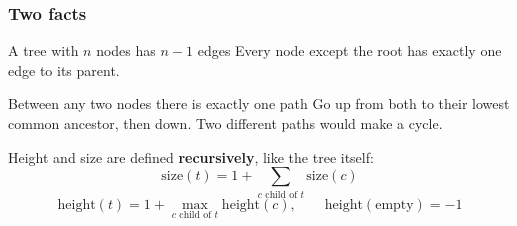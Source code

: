 \documentclass[aspectratio=169,10pt,compress]{beamer}
\begin{document}
\begin{frame}[t,fragile] \frametitle{Two facts}
  \begin{block}{A tree with $n$ nodes has $n - 1$ edges}
    \small Every node except the root has exactly one edge to its parent.
  \end{block}
  \begin{block}{Between any two nodes there is exactly one path}
    \small Go up from both to their lowest common ancestor, then down. Two different paths would make a cycle.
  \end{block}
  \vspace{0.3em}
  \small Height and size are defined \textbf{recursively}, like the tree itself:
  \[
  	\mathrm{size}(t) = 1 + \sum_{c \text{ child of } t} \mathrm{size}(c)
  \]
  \[
  	\mathrm{height}(t) = 1 + \max_{c \text{ child of } t} \mathrm{height}(c), \qquad \mathrm{height}(\text{empty}) = -1
  \]
\end{frame}

\end{document}
